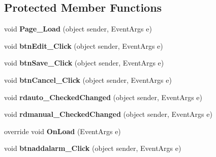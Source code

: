 \subsection*{Protected Member Functions}
\begin{DoxyCompactItemize}
\item 
\hypertarget{classusertrackothers__sleep__settings_abab5b68a68e7b56f7bd6e30b9748dbcf}{void {\bfseries Page\-\_\-\-Load} (object sender, Event\-Args e)}\label{classusertrackothers__sleep__settings_abab5b68a68e7b56f7bd6e30b9748dbcf}

\item 
\hypertarget{classusertrackothers__sleep__settings_ada4ac0c1e468fbd49b960a8ccae1273e}{void {\bfseries btn\-Edit\-\_\-\-Click} (object sender, Event\-Args e)}\label{classusertrackothers__sleep__settings_ada4ac0c1e468fbd49b960a8ccae1273e}

\item 
\hypertarget{classusertrackothers__sleep__settings_aee3105ce85913c24e72650d338436949}{void {\bfseries btn\-Save\-\_\-\-Click} (object sender, Event\-Args e)}\label{classusertrackothers__sleep__settings_aee3105ce85913c24e72650d338436949}

\item 
\hypertarget{classusertrackothers__sleep__settings_afe33532ae99f394f8cfa4adcc47c7059}{void {\bfseries btn\-Cancel\-\_\-\-Click} (object sender, Event\-Args e)}\label{classusertrackothers__sleep__settings_afe33532ae99f394f8cfa4adcc47c7059}

\item 
\hypertarget{classusertrackothers__sleep__settings_a1068658659ee12816d462844411a1f38}{void {\bfseries rdauto\-\_\-\-Checked\-Changed} (object sender, Event\-Args e)}\label{classusertrackothers__sleep__settings_a1068658659ee12816d462844411a1f38}

\item 
\hypertarget{classusertrackothers__sleep__settings_a9d21aaa9fc94770a89d95ecae965bfe3}{void {\bfseries rdmanual\-\_\-\-Checked\-Changed} (object sender, Event\-Args e)}\label{classusertrackothers__sleep__settings_a9d21aaa9fc94770a89d95ecae965bfe3}

\item 
\hypertarget{classusertrackothers__sleep__settings_a237e9c4855b2fcb3c9ff603df363d86f}{override void {\bfseries On\-Load} (Event\-Args e)}\label{classusertrackothers__sleep__settings_a237e9c4855b2fcb3c9ff603df363d86f}

\item 
\hypertarget{classusertrackothers__sleep__settings_a34f3436aa10bb8583312ac8017eec687}{void {\bfseries btnaddalarm\-\_\-\-Click} (object sender, Event\-Args e)}\label{classusertrackothers__sleep__settings_a34f3436aa10bb8583312ac8017eec687}

\end{DoxyCompactItemize}


